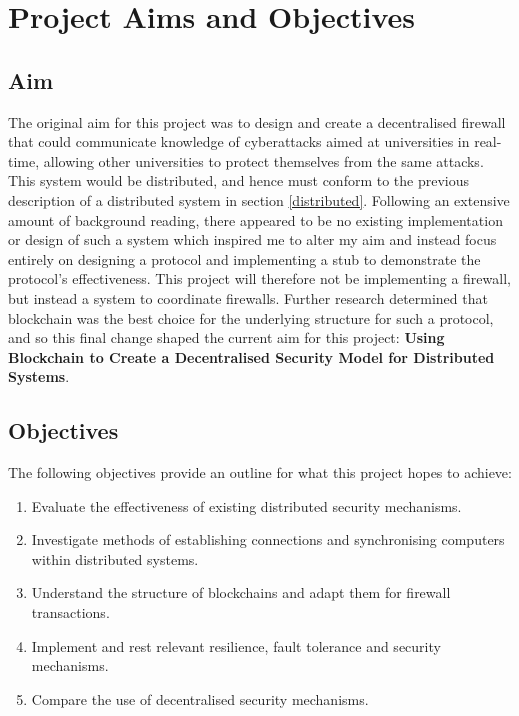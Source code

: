 \documentclass[a4paper, 11pt]{report}
\begin{document}
\chapter{Project Aims and Objectives}

\section{Aim} \label{aim}
The original aim for this project was to design and create a decentralised firewall that could communicate knowledge of cyberattacks aimed at universities in real-time, allowing other universities to protect themselves from the same attacks. This system would be distributed, and hence must conform to the previous description of a distributed system in section \ref{distributed}. Following an extensive amount of background reading, there appeared to be no existing implementation or design of such a system which inspired me to alter my aim and instead focus entirely on designing a protocol and implementing a \gls{stub} to demonstrate the protocol's effectiveness. This project will therefore not be implementing a firewall, but instead a system to coordinate firewalls. Further research determined that \gls{blockchain} was the best choice for the underlying structure for such a protocol, and so this final change shaped the current aim for this project: \textbf{Using Blockchain to Create a Decentralised Security Model for Distributed Systems}.

\section{Objectives}
The following objectives provide an outline for what this project hopes to achieve:

\begin{enumerate}
    \item Evaluate the effectiveness of existing distributed security mechanisms.
    \item Investigate methods of establishing connections and synchronising computers within distributed systems.
    \item Understand the structure of \gls{blockchain}s and adapt them for firewall transactions.
    \item Implement and rest relevant resilience, fault tolerance and security mechanisms.
    \item Compare the use of decentralised security mechanisms.
\end{enumerate}
\end{document}
